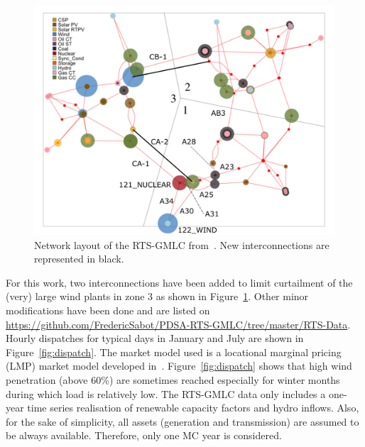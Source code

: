 \begin{figure}
    \centering
    \includegraphics[width=0.8\linewidth]{Figs/RTS.png}
    \caption{Network layout of the RTS-GMLC from~\cite{RTS-GMLC}. New interconnections are represented in black.}
    \label{fig:RTS}
\end{figure}

For this work, two interconnections have been added to limit curtailment of the (very) large wind plants in zone 3 as shown in Figure~\ref{fig:RTS}. Other minor modifications have been done and are listed on \url{https://github.com/FredericSabot/PDSA-RTS-GMLC/tree/master/RTS-Data}. Hourly dispatches for typical days in January and July are shown in Figure~\ref{fig:dispatch}. The market model used is a locational marginal pricing (LMP) market model developed in~\cite{Prescient}. Figure~\ref{fig:dispatch} shows that high wind penetration (above 60\%) are sometimes reached especially for winter months during which load is relatively low. The RTS-GMLC data only includes a one-year time series realisation of renewable capacity factors and hydro inflows. Also, for the sake of simplicity, all assets (generation and transmission) are assumed to be always available. Therefore, only one MC year is considered.

